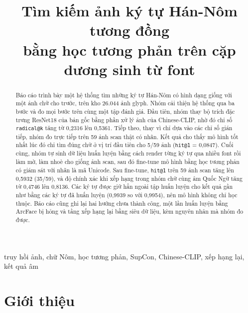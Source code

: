 \documentclass[conference,a4paper]{IEEEtran}
\newcommand{\code}[1]{{\small\texttt{#1}}}
\begin{document}
\title{Tìm kiếm ảnh ký tự Hán-Nôm tương đồng\\
bằng học tương phản trên cặp dương sinh từ font}

\author{
}

\maketitle

\begin{abstract}
Báo cáo trình bày một hệ thống tìm những ký tự Hán-Nôm có hình dạng giống với một ảnh chữ cho trước,
trên kho 26.044 ảnh glyph. Nhóm cải thiện hệ thống qua ba bước và đo mọi bước trên cùng một tập
đánh giá. Đầu tiên, nhóm thay bộ trích đặc trưng ResNet18 của bản gốc bằng phần xử lý ảnh của
Chinese-CLIP, nhờ đó chỉ số \code{radical@k} tăng từ 0,2316 lên 0,5361. Tiếp theo, thay vì chỉ dựa
vào các chỉ số gián tiếp, nhóm đo trực tiếp trên 59 ảnh scan thật có nhãn. Kết quả cho thấy mô hình
tốt nhất lúc đó chỉ tìm đúng chữ ở vị trí đầu tiên cho 5/59 ảnh (\code{hit@1} = 0,0847). Cuối cùng,
nhóm tự sinh dữ liệu huấn luyện bằng cách render từng ký tự qua nhiều font rồi làm mờ, làm nhoè cho
giống ảnh scan, sau đó fine-tune mô hình bằng học tương phản có giám sát với nhãn là mã Unicode. Sau
fine-tune, \code{hit@1} trên 59 ảnh scan tăng lên 0,5932 (35/59), và độ chính xác khi xếp hạng trong
nhóm chữ cùng âm Quốc Ngữ tăng từ 0,4746 lên 0,8136. Các ký tự được giữ hẳn ngoài tập huấn luyện cho
kết quả gần như bằng các ký tự đã huấn luyện (0,9939 so với 0,9954), nên mô hình không chỉ học thuộc.
Báo cáo cũng ghi lại hai hướng chưa thành công, một lần huấn luyện bằng ArcFace bị hỏng và tầng xếp
hạng lại bằng siêu dữ liệu, kèm nguyên nhân mà nhóm đo được.
\end{abstract}

\begin{IEEEkeywords}
truy hồi ảnh, chữ Nôm, học tương phản, SupCon, Chinese-CLIP, xếp hạng lại, kết quả âm
\end{IEEEkeywords}

\section{Giới thiệu}
\end{document}
